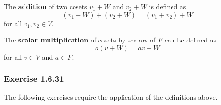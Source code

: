 \begin{definition}
    The \textbf{addition} of two cosets \( v_{1}  + W  \) and \( v_{2} + W  \) is defined as 
    \[ (v_{1} + W) + (v_{2} + W) = (v_{1} + v_{2}) + W  \]
    for all \( v_{1}, v_{2} \in V  \).
\end{definition}

\begin{definition}
    The \textbf{scalar multiplication} of cosets by scalars of \( F  \) can be defined as 
    \[  a ( v + W ) = av + W \]
    for all \( v \in V  \) and \( a \in F  \).
\end{definition}


\subsubsection{Exercise 1.6.31} The following exercises require the application of the definitions above.

